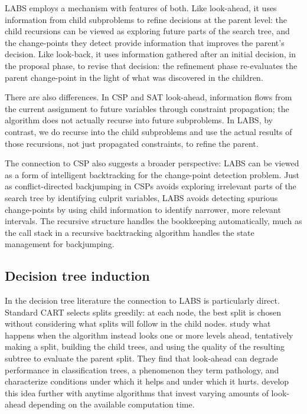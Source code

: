 \documentclass[12pt, a4paper]{article}
\begin{document}
LABS employs a mechanism with features of both. Like look-ahead, it uses information from child subproblems to refine decisions at the parent level: the child recursions can be viewed as exploring future parts of the search tree, and the change-points they detect provide information that improves the parent's decision. Like look-back, it uses information gathered after an initial decision, in the proposal phase, to revise that decision: the refinement phase re-evaluates the parent change-point in the light of what was discovered in the children.

There are also differences. In CSP and SAT look-ahead, information flows from the current assignment to future variables through constraint propagation; the algorithm does not actually recurse into future subproblems. In LABS, by contrast, we do recurse into the child subproblems and use the actual results of those recursions, not just propagated constraints, to refine the parent.

The connection to CSP also suggests a broader perspective: LABS can be viewed as a form of intelligent backtracking for the change-point detection problem. Just as conflict-directed backjumping in CSPs avoids exploring irrelevant parts of the search tree by identifying culprit variables, LABS avoids detecting spurious change-points by using child information to identify narrower, more relevant intervals. The recursive structure handles the bookkeeping automatically, much as the call stack in a recursive backtracking algorithm handles the state management for backjumping.

\subsection{Decision tree induction}

In the decision tree literature the connection to LABS is particularly direct. Standard CART \citep{bfso84} selects splits greedily: at each node, the best split is chosen without considering what splits will follow in the child nodes. \cite{ms95} study what happens when the algorithm instead looks one or more levels ahead, tentatively making a split, building the child trees, and using the quality of the resulting subtree to evaluate the parent split. They find that look-ahead can degrade performance in classification trees, a phenomenon they term pathology, and characterize conditions under which it helps and under which it hurts. \cite{em07} develop this idea further with anytime algorithms that invest varying amounts of look-ahead depending on the available computation time.
\end{document}
